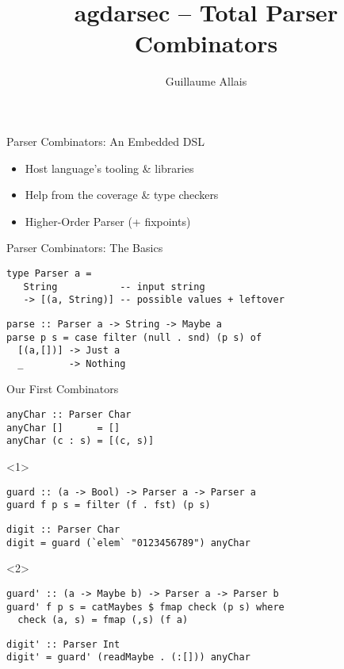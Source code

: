 \documentclass{beamer}
\title{agdarsec -- Total Parser Combinators}
\author{Guillaume Allais}
\institute[Radboud University Nijmegen]{
  Brouwer Seminar \\
  Radboud University Nijmegen}
\begin{document}
\maketitle

\begin{frame}{Parser Combinators: An Embedded DSL}

\begin{itemize}
  \item Host language's tooling \& libraries
  \item Help from the coverage \& type checkers
  \item Higher-Order Parser (+ fixpoints)
\end{itemize}

\end{frame}

\begin{frame}[fragile]{Parser Combinators: The Basics}

\begin{verbatim}
type Parser a =
   String           -- input string
   -> [(a, String)] -- possible values + leftover
\end{verbatim}

\begin{verbatim}
parse :: Parser a -> String -> Maybe a
parse p s = case filter (null . snd) (p s) of
  [(a,[])] -> Just a
  _        -> Nothing 
\end{verbatim}
\end{frame}

\begin{frame}[fragile]{Our First Combinators}
\begin{verbatim}
anyChar :: Parser Char
anyChar []      = []
anyChar (c : s) = [(c, s)]
\end{verbatim}
\begin{onlyenv}<1>
\begin{verbatim}
guard :: (a -> Bool) -> Parser a -> Parser a
guard f p s = filter (f . fst) (p s)
\end{verbatim}
\begin{verbatim}
digit :: Parser Char
digit = guard (`elem` "0123456789") anyChar
\end{verbatim}
\end{onlyenv}
\begin{onlyenv}<2>
\begin{verbatim}
guard' :: (a -> Maybe b) -> Parser a -> Parser b
guard' f p s = catMaybes $ fmap check (p s) where
  check (a, s) = fmap (,s) (f a)
\end{verbatim}
\begin{verbatim}
digit' :: Parser Int
digit' = guard' (readMaybe . (:[])) anyChar
\end{verbatim}
\end{onlyenv}
\end{frame}
\end{document}
